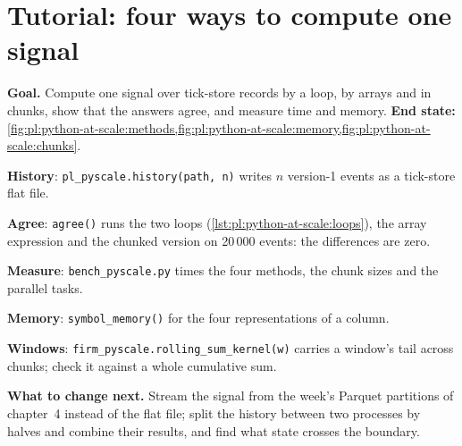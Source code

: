 \begin{omfigure}

\label{fig:pl:python-at-scale:parallel}
\end{omfigure}

\section{Tutorial: four ways to compute one signal}\label{tut:pl:python-at-scale:tut}

\begin{tutorial}
\textbf{Goal.} Compute one signal over tick-store records by a loop, by arrays and in chunks, show that the answers agree, and
measure time and memory. \textbf{End state:} \cref{fig:pl:python-at-scale:methods,fig:pl:python-at-scale:memory,fig:pl:python-at-scale:chunks}.
\begin{tutsteps}
\item \textbf{History}: \texttt{pl\_pyscale.history(path, n)} writes $n$ version-1 events as a tick-store flat file.
\item \textbf{Agree}: \texttt{agree()} runs the two loops (\cref{lst:pl:python-at-scale:loops}), the array expression and the
chunked version on 20\,000 events: the differences are zero.
\item \textbf{Measure}: \texttt{bench\_pyscale.py} times the four methods, the chunk sizes and the parallel tasks.
\item \textbf{Memory}: \texttt{symbol\_memory()} for the four representations of a column.
\item \textbf{Windows}: \texttt{firm\_pyscale.rolling\_sum\_kernel(w)} carries a window's tail across chunks; check it against a whole
cumulative sum.
\end{tutsteps}
\textbf{What to change next.} Stream the signal from the week's Parquet partitions of chapter~4 instead of the flat file; split the
history between two processes by halves and combine their results, and find what state crosses the boundary.
\end{tutorial}

